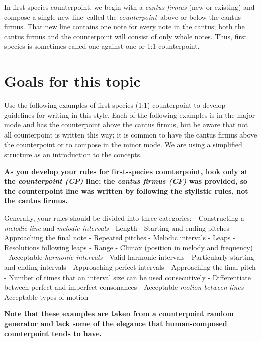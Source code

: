 \documentclass{book}
\begin{document}
In first species counterpoint, we begin with a \emph{cantus firmus} (new or
existing) and compose a single new line--called the \emph{counterpoint}--above
or below the cantus firmus. That new line contains one note for every note in
the cantus; both the cantus firmus and the counterpoint will consist of only
whole notes. Thus, first species is sometimes called one-against-one or 1:1
counterpoint.

\hypertarget{goals-for-this-topic-6}{%
\section{Goals for this topic}\label{goals-for-this-topic-6}}

Use the following examples of first-species (1:1) counterpoint to develop
guidelines for writing in this style. Each of the following examples is in the
major mode and has the counterpoint above the cantus firmus, but be aware that
not all counterpoint is written this way; it is common to have the cantus
firmus above the counterpoint or to compose in the minor mode. We are using a
simplified structure as an introduction to the concepts.

\textbf{As you develop your rules for first-species counterpoint, look only at
the \emph{counterpoint (CP)} line; the \emph{cantus firmus (CF)} was provided,
so the counterpoint line was written by following the stylistic rules, not the
cantus firmus.}

Generally, your rules should be divided into three categories: - Constructing
a \emph{melodic line} and \emph{melodic intervals} - Length - Starting and
ending pitches - Approaching the final note - Repeated pitches - Melodic
intervals - Leaps - Resolutions following leaps - Range - Climax (position in
melody and frequency) - Acceptable \emph{harmonic intervals} - Valid harmonic
intervals - Particularly starting and ending intervals - Approaching perfect
intervals - Approaching the final pitch - Number of times that an interval
size can be used consecutively - Differentiate between perfect and imperfect
consonances - Acceptable \emph{motion between lines} - Acceptable types of
motion

\textbf{Note that these examples are taken from a counterpoint random
generator and lack some of the elegance that human-composed counterpoint tends
to have.}
\end{document}
